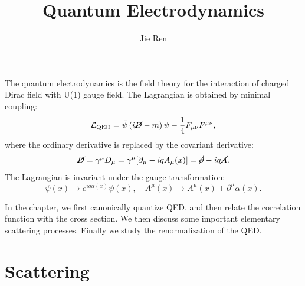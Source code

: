 \documentclass[aps,prb,superscriptaddress,nofootinbib]{revtex4}
\begin{document}
\title{Quantum Electrodynamics}
\author{Jie Ren}


\maketitle




The quantum electrodynamics is the field theory for the interaction of charged Dirac field with U(1) gauge field. 
The Lagrangian is obtained by minimal coupling:
\begin{equation}
	\mathcal{L}_{\mathrm{QED}}
	= \bar\psi \left(i\cancel{D} - m\right)\psi - \frac{1}{4}F_{\mu\nu}F^{\mu\nu},
\end{equation}
where the ordinary derivative is replaced by the covariant derivative:
\begin{equation}
	\cancel{D} = \gamma^\mu D_\mu 
	= \gamma^\mu [\partial_\mu - i q A_\mu(x)]
	= \cancel{\partial} - iq \cancel{A}.
\end{equation}
The Lagrangian is invariant under the gauge transformation:
\begin{equation}
	\psi(x) \rightarrow e^{iq\alpha(x)}\psi(x), \quad
	A^\mu(x) \rightarrow A^\mu(x) + \partial^\mu \alpha(x).
\end{equation}

In the chapter, we first canonically quantize QED, and then relate the correlation function with the cross section.
We then discuss some important elementary scattering processes.
Finally we study the renormalization of the QED.

\tableofcontents

\section{Scattering}
\end{document}
